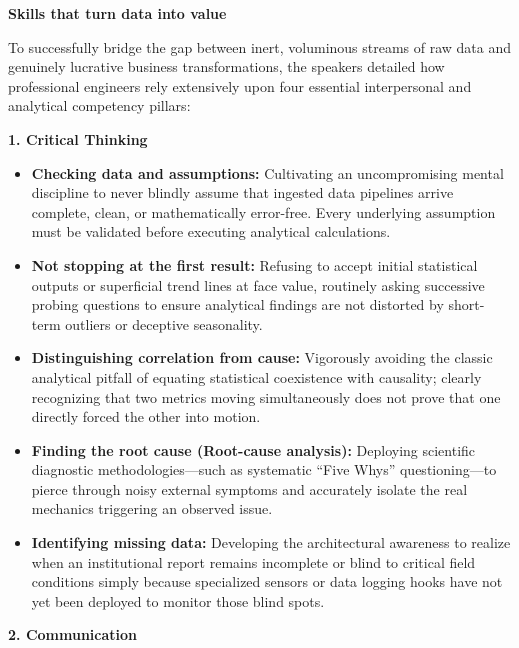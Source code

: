 \vspace{0.5em}\noindent\textbf{Skills that turn data into
value}\par

To successfully bridge the gap between inert, voluminous streams of raw
data and genuinely lucrative business transformations, the speakers
detailed how professional engineers rely extensively upon four essential
interpersonal and analytical competency pillars:

\vspace{0.5em}\noindent\textbf{1. Critical Thinking}\par

\begin{itemize}
\tightlist
\item
  \textbf{Checking data and assumptions:} Cultivating an uncompromising
  mental discipline to never blindly assume that ingested data pipelines
  arrive complete, clean, or mathematically error-free. Every underlying
  assumption must be validated before executing analytical calculations.
\item
  \textbf{Not stopping at the first result:} Refusing to accept initial
  statistical outputs or superficial trend lines at face value,
  routinely asking successive probing questions to ensure analytical
  findings are not distorted by short-term outliers or deceptive
  seasonality.
\item
  \textbf{Distinguishing correlation from cause:} Vigorously avoiding
  the classic analytical pitfall of equating statistical coexistence
  with causality; clearly recognizing that two metrics moving
  simultaneously does not prove that one directly forced the other into
  motion.
\item
  \textbf{Finding the root cause (Root-cause analysis):} Deploying
  scientific diagnostic methodologies---such as systematic ``Five Whys''
  questioning---to pierce through noisy external symptoms and accurately
  isolate the real mechanics triggering an observed issue.
\item
  \textbf{Identifying missing data:} Developing the architectural
  awareness to realize when an institutional report remains incomplete
  or blind to critical field conditions simply because specialized
  sensors or data logging hooks have not yet been deployed to monitor
  those blind spots.
\end{itemize}

\vspace{0.5em}\noindent\textbf{2. Communication}\par

